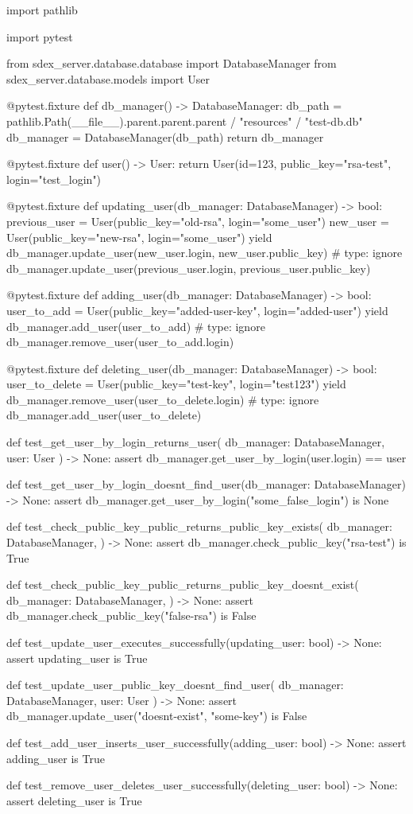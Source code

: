 \documentclass[../main.tex]{subfiles}
\begin{document}
\begin{mypython}[caption={Testy jednostkowe sprawdzające operacje wykonywane na bazie danych},label={lst:python_database_management_test}]
import pathlib

import pytest

from sdex_server.database.database import DatabaseManager
from sdex_server.database.models import User


@pytest.fixture
def db_manager() -> DatabaseManager:
    db_path = pathlib.Path(__file__).parent.parent.parent / "resources" / "test-db.db"
    db_manager = DatabaseManager(db_path)
    return db_manager


@pytest.fixture
def user() -> User:
    return User(id=123, public_key="rsa-test", login="test_login")


@pytest.fixture
def updating_user(db_manager: DatabaseManager) -> bool:
    previous_user = User(public_key="old-rsa", login="some_user")
    new_user = User(public_key="new-rsa", login="some_user")
    yield db_manager.update_user(new_user.login, new_user.public_key)  # type: ignore
    db_manager.update_user(previous_user.login, previous_user.public_key)


@pytest.fixture
def adding_user(db_manager: DatabaseManager) -> bool:
    user_to_add = User(public_key="added-user-key", login="added-user")
    yield db_manager.add_user(user_to_add)  # type: ignore
    db_manager.remove_user(user_to_add.login)


@pytest.fixture
def deleting_user(db_manager: DatabaseManager) -> bool:
    user_to_delete = User(public_key="test-key", login="test123")
    yield db_manager.remove_user(user_to_delete.login)  # type: ignore
    db_manager.add_user(user_to_delete)


def test_get_user_by_login_returns_user(
    db_manager: DatabaseManager, user: User
) -> None:
    assert db_manager.get_user_by_login(user.login) == user


def test_get_user_by_login_doesnt_find_user(db_manager: DatabaseManager) -> None:
    assert db_manager.get_user_by_login("some_false_login") is None


def test_check_public_key_public_returns_public_key_exists(
    db_manager: DatabaseManager,
) -> None:
    assert db_manager.check_public_key("rsa-test") is True


def test_check_public_key_public_returns_public_key_doesnt_exist(
    db_manager: DatabaseManager,
) -> None:
    assert db_manager.check_public_key("false-rsa") is False


def test_update_user_executes_successfully(updating_user: bool) -> None:
    assert updating_user is True


def test_update_user_public_key_doesnt_find_user(
    db_manager: DatabaseManager, user: User
) -> None:
    assert db_manager.update_user("doesnt-exist", "some-key") is False


def test_add_user_inserts_user_successfully(adding_user: bool) -> None:
    assert adding_user is True


def test_remove_user_deletes_user_successfully(deleting_user: bool) -> None:
    assert deleting_user is True
\end{mypython}
\end{document}
